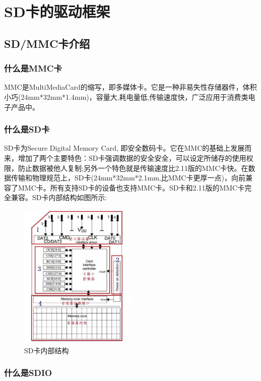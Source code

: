 \section{SD卡的驱动框架}

\subsection{SD/MMC卡介绍}

\subsubsection{什么是MMC卡}

MMC是MultiMediaCard的缩写，即多媒体卡。它是一种非易失性存储器件，体积小巧(24mm*32mm*1.4mm)，容量大,耗电量低,传输速度快，广泛应用于消费类电子产品中。

\subsubsection{什么是SD卡}

SD卡为Secure Digital Memory Card, 即安全数码卡。它在MMC的基础上发展而来，增加了两个主要特色：SD卡强调数据的安全安全，可以设定所储存的使用权限，防止数据被他人复制;另外一个特色就是传输速度比2.11版的MMC卡快。在数据传输和物理规范上，SD卡(24mm*32mm*2.1mm,比MMC卡更厚一点)，向前兼容了MMC卡。所有支持SD卡的设备也支持MMC卡。SD卡和2.11版的MMC卡完全兼容。SD卡内部结构如图所示:
\begin{figure}[H]
	\centering
	\includegraphics[width=0.5\textwidth]{figures/06-02-SD.jpg}
	\caption{SD卡内部结构}
\end{figure}

\subsubsection{什么是SDIO}

